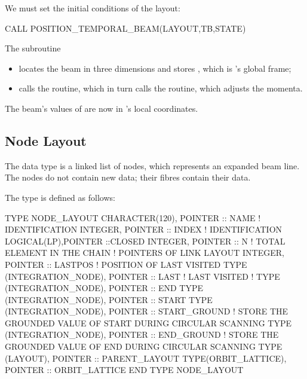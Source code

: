 We must set the initial conditions of the layout:

\begin{ptccode}
CALL POSITION_TEMPORAL_BEAM(LAYOUT,TB,STATE)
\end{ptccode}

%
The subroutine 
\begin{itemize}
  \item locates the beam in three dimensions and stores ,
  which is \PTC's global frame;
  \item calls the  routine, which in turn calls the
    routine, which adjusts the momenta.
\end{itemize}

The beam's values of  are now in \PTC's local
coordinates.


\subsection{Node Layout}

%
The data type  is a linked list of nodes,
which represents an expanded beam line. The nodes do not contain new
data; their fibres contain their data.

The type  is defined as follows:

\begin{ptccode}
TYPE NODE_LAYOUT
  CHARACTER(120), POINTER ::  NAME ! IDENTIFICATION
  INTEGER, POINTER ::  INDEX ! IDENTIFICATION
  LOGICAL(LP),POINTER ::CLOSED
  INTEGER,  POINTER :: N  ! TOTAL ELEMENT IN THE CHAIN
  ! POINTERS OF LINK LAYOUT
  INTEGER, POINTER :: LASTPOS   ! POSITION OF LAST VISITED
  TYPE (INTEGRATION_NODE), POINTER :: LAST ! LAST VISITED
  !
  TYPE (INTEGRATION_NODE), POINTER :: END
  TYPE (INTEGRATION_NODE), POINTER :: START
  TYPE (INTEGRATION_NODE), POINTER :: START_GROUND
  ! STORE THE GROUNDED VALUE OF START DURING CIRCULAR SCANNING
  TYPE (INTEGRATION_NODE), POINTER :: END_GROUND
  ! STORE THE GROUNDED VALUE OF END DURING CIRCULAR SCANNING
  TYPE (LAYOUT), POINTER :: PARENT_LAYOUT
  TYPE(ORBIT_LATTICE), POINTER :: ORBIT_LATTICE
END TYPE NODE_LAYOUT
\end{ptccode}


